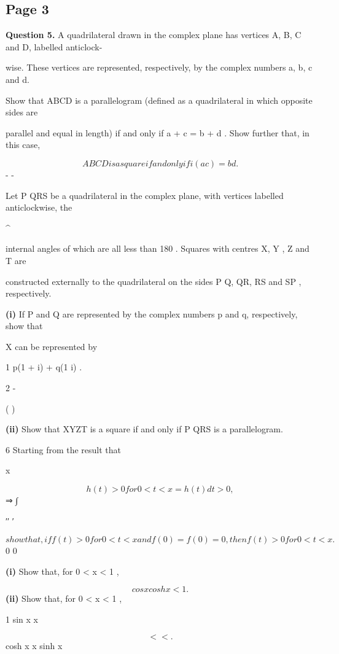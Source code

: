\documentclass[12pt]{article}
\begin{document}
\subsection*{Page 3}
\begin{flushleft}
\bigskip\textbf{Question 5.} A quadrilateral drawn in the complex plane has vertices A, B, C and D, labelled anticlock-\par
wise. These vertices are represented, respectively, by the complex numbers a, b, c and d.\par
Show that ABCD is a parallelogram (defined as a quadrilateral in which opposite sides are\par
parallel and equal in length) if and only if a + c = b + d . Show further that, in this case,\par
\[ABCD is a square if and only if i(a c) = b d.\]
- -\par
Let P QRS be a quadrilateral in the complex plane, with vertices labelled anticlockwise, the\par
\textasciicircum{}\circ\par
internal angles of which are all less than 180 . Squares with centres X, Y , Z and T are\par
constructed externally to the quadrilateral on the sides P Q, QR, RS and SP , respectively.\par
\textbf{(i)} If P and Q are represented by the complex numbers p and q, respectively, show that\par
X can be represented by\par
1 p(1 + i) + q(1 i) .\par
2 -\par
( )\par
\textbf{(ii)} Show that XYZT is a square if and only if P QRS is a parallelogram.\par
6 Starting from the result that\par
x\par
\[h(t) > 0 for 0 < t < x = h(t) dt > 0 ,\]
⇒ ∫\par
′′ ′\par
\[show that, if f (t) > 0 for 0 < t < x and f(0) = f (0) = 0, then f(t) > 0 for 0 < t < x .\]
0 0\par
\textbf{(i)} Show that, for 0 < x < 1 \pi,\par
\[cos x cosh x < 1 .\]
\textbf{(ii)} Show that, for 0 < x < 1 \pi,\par
1 sin x x\par
\[< < .\]
cosh x x sinh x\par
\end{flushleft}
\end{document}
